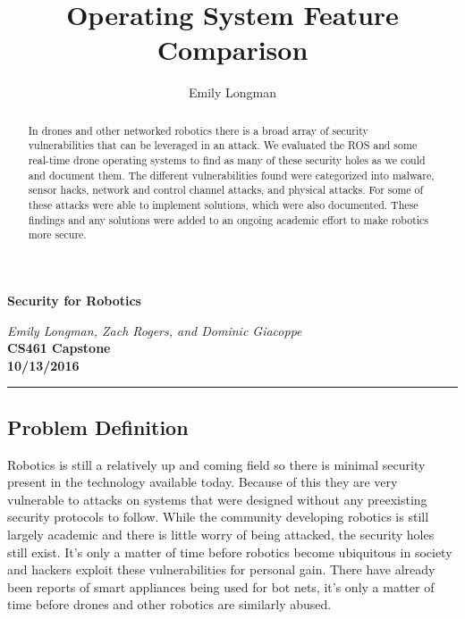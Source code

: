 \documentclass[IEEEtran,letterpaper,10pt,titlepage,draftclsnofoot,onecolumn]{article}
\title{Operating System Feature Comparison}
\author{Emily Longman}
\begin{document}
\begin{titlepage}
  \begin{center}
    \vspace*{1cm}
    
    \huge
    \textbf{Security for Robotics}      
  \vspace{0.5cm}
        
    \textit{Emily Longman, Zach Rogers, and Dominic Giacoppe}\\ 
  \vspace{0.5cm}
    \vfill
    \large
    \textbf{CS461 Capstone}\\ 
  \vspace{5mm}
    \textbf{10/13/2016}\\ 
    
    \vfill
    \end{center}
\end{titlepage}

\begin{abstract}
  In drones and other networked robotics there is a broad array of security vulnerabilities that can be leveraged in an attack. 
  We evaluated the ROS and some real-time drone operating systems to find as many of these security holes as we could and document them. 
  The different vulnerabilities found were categorized into malware, sensor hacks, network and control channel attacks, and physical attacks. 
  For some of these attacks were able to implement solutions, which were also documented. 
  These findings and any solutions were added to an ongoing academic effort to make robotics more secure.
\end{abstract}

\hrule\vspace{5mm}

\subsection*{Problem Definition}
Robotics is still a relatively up and coming field so there is minimal security present in the technology available today. 
Because of this they are very vulnerable to attacks on systems that were designed without any preexisting security protocols to follow.
While the community developing robotics is still largely academic and there is little worry of being attacked, the security holes still exist. 
It's only a matter of time before robotics become ubiquitous in society and hackers exploit these vulnerabilities for personal gain.
There have already been reports of smart appliances being used for bot nets, it's only a matter of time before drones and other robotics are similarly abused.
\end{document}
